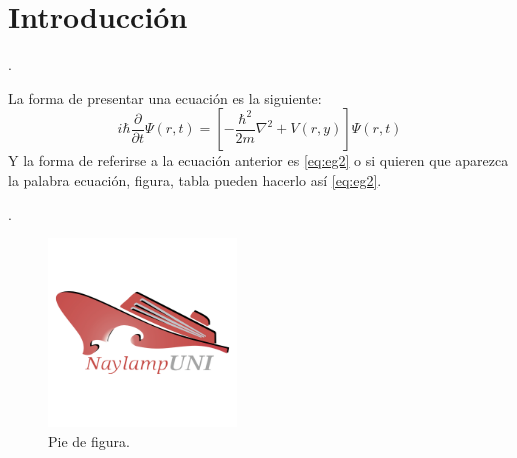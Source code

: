\documentclass[11pt,letterpaper,twocolumn]{article}
\begin{document}
\section{Introducción}
\lipsum[1].\par
La forma de presentar una ecuación es la siguiente: 
\begin{equation}
    \label{eq:eg2}
    i \hbar \frac{\partial}{\partial t} \Psi (r,t)= \left[ -\frac{\hbar^{2}}{2m} \nabla^{2} +V(r,y)\right] \Psi (r,t)
\end{equation}
Y la forma de referirse a la ecuación anterior es \ref{eq:eg2} o si quieren que aparezca la palabra ecuación, figura, tabla pueden hacerlo así \autoref{eq:eg2}. \par 

\lipsum[2].\par 
 
\begin{table}[H]
	\begin{center}
	\end{center}
	\label{cua:1}
	\caption{Valores de distancias y diámetros respectivos}
\end{table}
\lipsum[1-3]

\begin{figure}[ht]
    \centering
    \includegraphics[width=5cm]{NU_Logo.png} 
    \caption{Pie de figura.}
    \label{fig:my_label}
\end{figure}
\end{document}
